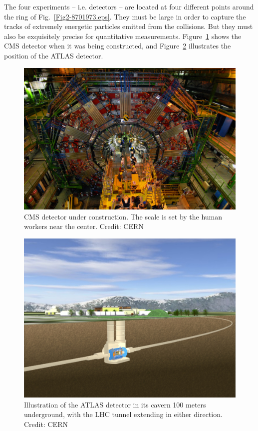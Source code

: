 \documentclass[12pt]{iopart}
\begin{document}
The four experiments -- i.e. detectors -- are located at four different points around the ring of Fig.~\ref{Fig2-8701973.eps}. They must be large in order to capture the tracks of extremely energetic particles emitted from the collisions. But they must also be exquisitely precise for quantitative measurements. Figure~\ref{Fig14-DSC_0159.eps} shows the CMS detector when it was being constructed, and Figure~\ref{Fig14a-atlasdet.eps} illustrates the position of the ATLAS detector.
\begin{figure}[htbp]
\centering
\includegraphics[bb=0 0 360 250, width=5in]{Fig14-DSC_0159.eps}
\caption{CMS detector under construction. The scale is set by the human workers near the center. Credit: CERN \label{Fig14-DSC_0159.eps}}
\end{figure}
\begin{figure}[htbp]
\centering
\includegraphics[bb=0 0 360 270, width=5in]{Fig14a-atlasdet.eps}
\caption{Illustration of the ATLAS detector in its cavern 100 meters underground, with the LHC tunnel extending in either direction. Credit: CERN \label{Fig14a-atlasdet.eps}}
\end{figure}
\end{document}
